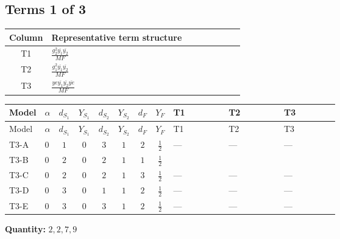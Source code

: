 \documentclass[8pt]{article}
\begin{document}
\begin{landscape}
\subsection*{Terms 1 of 3}
\begin{center}
\begin{tabular}{@{}c >{\raggedright\arraybackslash}p{0.82\linewidth}@{}}
\toprule
Column & Representative term structure \\
\midrule
T1 & \(\displaystyle \frac{g_{2}^{2} \overline{y_{1}} \overline{y_{2}}}{MF}\) \\
\midrule
T2 & \(\displaystyle \frac{g_{1}^{2} \overline{y_{1}} \overline{y_{2}}}{MF}\) \\
\midrule
T3 & \(\displaystyle \frac{ye \overline{y_{1}} \overline{y_{2}} \overline{ye}}{MF}\) \\
\midrule
\bottomrule
\end{tabular}
\end{center}
\smallskip
\tiny
\begin{longtable}{@{}llcccccc >{\raggedright\arraybackslash}p{0.21\linewidth} >{\raggedright\arraybackslash}p{0.21\linewidth} >{\raggedright\arraybackslash}p{0.21\linewidth}@{}}
\toprule
Model & $\alpha$ & $d_{S_1}$ & $Y_{S_1}$ & $d_{S_2}$ & $Y_{S_2}$ & $d_F$ & $Y_F$ & T1 & T2 & T3 \\
\midrule
\endfirsthead
\toprule
Model & $\alpha$ & $d_{S_1}$ & $Y_{S_1}$ & $d_{S_2}$ & $Y_{S_2}$ & $d_F$ & $Y_F$ & T1 & T2 & T3 \\
\midrule
\endhead
T3-A & $0$ & $1$ & $0$ & $3$ & $1$ & $2$ & $\frac{1}{2}$ & --- & --- & --- \\
\midrule
T3-B & $0$ & $2$ & $0$ & $2$ & $1$ & $1$ & $\frac{1}{2}$ & \scriptsize\adjustbox{max width=\linewidth}{$\begin{gathered} \frac{3 g_{2}^{2} \overline{y_{1}} \overline{y_{2}}}{4 MF}\end{gathered}$} & \scriptsize\adjustbox{max width=\linewidth}{$\begin{gathered} \frac{3 g_{1}^{2} \overline{y_{1}} \overline{y_{2}}}{8 MF}\end{gathered}$} & \scriptsize\adjustbox{max width=\linewidth}{$\begin{gathered} - \frac{ye \overline{y_{1}} \overline{y_{2}} \overline{ye}}{4 MF}\end{gathered}$} \\
\midrule
T3-C & $0$ & $2$ & $0$ & $2$ & $1$ & $3$ & $\frac{1}{2}$ & --- & --- & --- \\
\midrule
T3-D & $0$ & $3$ & $0$ & $1$ & $1$ & $2$ & $\frac{1}{2}$ & --- & --- & --- \\
\midrule
T3-E & $0$ & $3$ & $0$ & $3$ & $1$ & $2$ & $\frac{1}{2}$ & --- & --- & --- \\
\midrule
\bottomrule
\end{longtable}
\clearpage
\noindent\textbf{Quantity: }$\mathrm{2,2,7,9}$\par\smallskip

\end{landscape}
\end{document}
